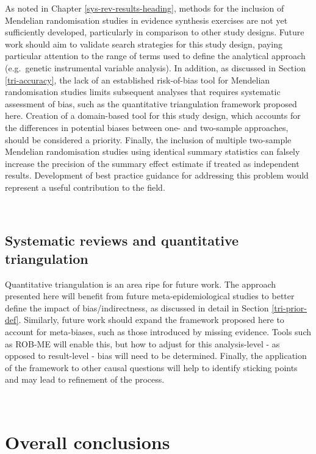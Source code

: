 \documentclass[a4paper, twoside]{templates/ociamthesis}
\begin{document}
As noted in Chapter \ref{sys-rev-results-heading}, methods for the inclusion of Mendelian randomisation studies in evidence synthesis exercises are not yet sufficiently developed, particularly in comparison to other study designs. Future work should aim to validate search strategies for this study design, paying particular attention to the range of terms used to define the analytical approach (e.g.~genetic instrumental variable analysis). In addition, as discussed in Section \ref{tri-accuracy}, the lack of an established risk-of-bias tool for Mendelian randomisation studies limits subsequent analyses that requires systematic assessment of bias, such as the quantitative triangulation framework proposed here. Creation of a domain-based tool for this study design, which accounts for the differences in potential biases between one- and two-sample approaches, should be considered a priority.
Finally, the inclusion of multiple two-sample Mendelian randomisation studies using identical summary statistics can falsely increase the precision of the summary effect estimate if treated as independent results. Development of best practice guidance for addressing this problem would represent a useful contribution to the field.

~

\hypertarget{systematic-reviews-and-quantitative-triangulation}{%
\subsection{Systematic reviews and quantitative triangulation}\label{systematic-reviews-and-quantitative-triangulation}}

Quantitative triangulation is an area ripe for future work. The approach presented here will benefit from future meta-epidemiological studies to better define the impact of bias/indirectness, as discussed in detail in Section \ref{tri-prior-def}. Similarly, future work should expand the framework proposed here to account for meta-biases, such as those introduced by missing evidence. Tools such as ROB-ME will enable this, but how to adjust for this analysis-level - as opposed to result-level - bias will need to be determined. Finally, the application of the framework to other causal questions will help to identify sticking points and may lead to refinement of the process.

~

\hypertarget{overall-conclusions}{%
\section{Overall conclusions}\label{overall-conclusions}}
\end{document}
